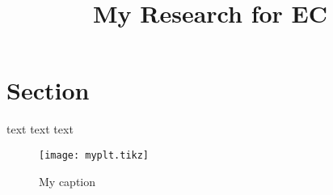 \documentclass{article}
\begin{document}
\title{My Research for EC}
\maketitle
\section{Section}
text text text
\begin{figure}
\texttt{[image: myplt.tikz]}
\caption{My caption}
\end{figure}
\end{document}
